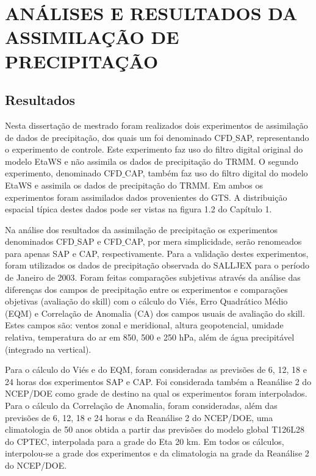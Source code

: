 \hypertarget{estilo:capitulo}{}
\chapter{ANÁLISES E RESULTADOS DA ASSIMILAÇÃO DE \-PRE\-CI\-PI\-TA\-ÇÃO}

\section{Resultados}
\label{ss:resultados}

Nesta dissertação de mestrado foram realizados dois experimentos de assimilação de dados de precipitação, dos quais um foi denominado CFD$\_$SAP, representando o experimento de controle. Este experimento faz uso do filtro digital original do modelo EtaWS e não assimila os dados de precipitação do TRMM. O segundo experimento, denominado CFD$\_$CAP, também faz uso do filtro digital do modelo EtaWS e assimila os dados de precipitação do TRMM. Em ambos os experimentos foram assimilados dados provenientes do GTS. A distribuição espacial típica destes dados pode ser vistas na figura 1.2 do Capítulo 1.

Na análise dos resultados da assimilação de precipitação os experimentos denominados CFD$\_$SAP e CFD$\_$CAP, por mera simplicidade, serão renomeados para apenas SAP e CAP, respectivamente. Para a validação destes experimentos, foram utilizados os dados de precipitação observada do SALLJEX para o período de Janeiro de 2003. Foram feitas comparações subjetivas através da análise das diferenças dos campos de precipitação entre os experimentos e comparações objetivas (avaliação do skill) com o cálculo do Viés, Erro Quadrático Médio (EQM) e Correlação de Anomalia (CA) dos campos usuais de avaliação do skill. Estes campos são: ventos zonal e meridional, altura geopotencial, umidade relativa, temperatura do ar em 850, 500 e 250 hPa, além de água precipitável (integrado na vertical).

Para o cálculo do Viés e do EQM, foram consideradas as previsões de 6, 12, 18 e 24 horas dos experimentos SAP e CAP. Foi considerada também a Reanálise 2 do NCEP/DOE como grade de destino na qual os experimentos foram interpolados. Para o cálculo da Correlação de Anomalia, foram consideradas, além das previsões de 6, 12, 18 e 24 horas e da Reanálise 2 do NCEP/DOE, uma climatologia de 50 anos obtida a partir das previsões do modelo global T126L28 do CPTEC, interpolada para a grade do Eta 20 km. 
Em todos os cálculos, interpolou-se a grade dos experimentos e da climatologia na grade da Reanálise 2 do NCEP/DOE.

